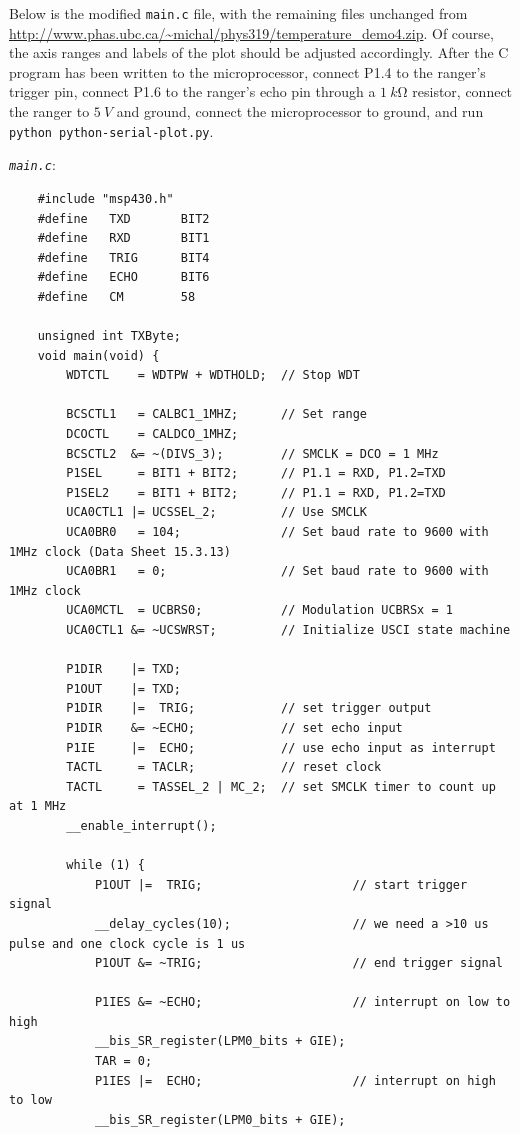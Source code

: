 \documentclass[letterpaper]{article}
\begin{document}
	Below is the modified \texttt{main.c} file, with the remaining files unchanged from \url{http://www.phas.ubc.ca/~michal/phys319/temperature_demo4.zip}. Of course, the axis ranges and labels of the plot should be adjusted accordingly. After the C program has been written to the microprocessor, connect P1.4 to the ranger's trigger pin, connect P1.6 to the ranger's echo pin through a $\SI{1}{k\ohm}$ resistor, connect the ranger to $\SI{5}{V}$ and ground, connect the microprocessor to ground, and run \texttt{python python-serial-plot.py}.
	
	\newpage	
	\noindent \textit{\texttt{main.c}}:
	\begin{verbatim}
    #include "msp430.h"
    #define   TXD       BIT2
    #define   RXD       BIT1
    #define   TRIG      BIT4
    #define   ECHO      BIT6
    #define   CM        58
    
    unsigned int TXByte;
    void main(void) {
        WDTCTL    = WDTPW + WDTHOLD;  // Stop WDT
    
        BCSCTL1   = CALBC1_1MHZ;      // Set range
        DCOCTL    = CALDCO_1MHZ;
        BCSCTL2  &= ~(DIVS_3);        // SMCLK = DCO = 1 MHz
        P1SEL     = BIT1 + BIT2;      // P1.1 = RXD, P1.2=TXD
        P1SEL2    = BIT1 + BIT2;      // P1.1 = RXD, P1.2=TXD
        UCA0CTL1 |= UCSSEL_2;         // Use SMCLK
        UCA0BR0   = 104;              // Set baud rate to 9600 with 1MHz clock (Data Sheet 15.3.13)
        UCA0BR1   = 0;                // Set baud rate to 9600 with 1MHz clock
        UCA0MCTL  = UCBRS0;           // Modulation UCBRSx = 1
        UCA0CTL1 &= ~UCSWRST;         // Initialize USCI state machine
    
        P1DIR    |= TXD;
        P1OUT    |= TXD;
        P1DIR    |=  TRIG;            // set trigger output
        P1DIR    &= ~ECHO;            // set echo input
        P1IE     |=  ECHO;            // use echo input as interrupt
        TACTL     = TACLR;            // reset clock
        TACTL     = TASSEL_2 | MC_2;  // set SMCLK timer to count up at 1 MHz
        __enable_interrupt();
    
        while (1) {
            P1OUT |=  TRIG;                     // start trigger signal
            __delay_cycles(10);                 // we need a >10 us pulse and one clock cycle is 1 us
            P1OUT &= ~TRIG;                     // end trigger signal
    
            P1IES &= ~ECHO;                     // interrupt on low to high
            __bis_SR_register(LPM0_bits + GIE);
            TAR = 0;
            P1IES |=  ECHO;                     // interrupt on high to low
            __bis_SR_register(LPM0_bits + GIE);
    

\end{verbatim}
\end{document}
